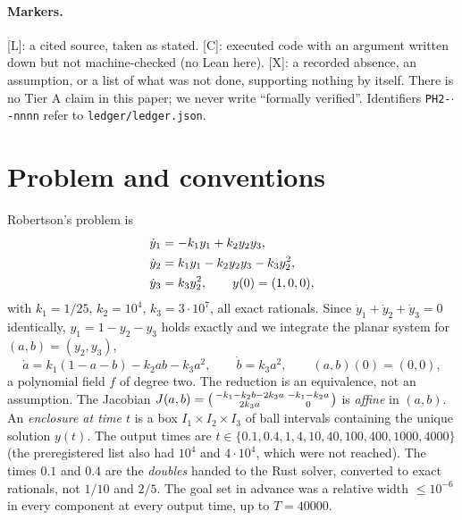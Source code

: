 \documentclass[11pt]{article}
\newcommand{\tier}[1]{\textsf{[#1]}}
\newcommand{\tL}{\tier{L}}
\newcommand{\tC}{\tier{C}}
\newcommand{\tX}{\tier{X}}
\theoremstyle{remark}
\begin{document}
\paragraph{Markers.} \tL{}: a cited source, taken as stated. \tC{}: executed code with an argument written down but not machine-checked (no Lean here). \tX{}: a recorded absence, an assumption, or a list of what was not done, supporting nothing by itself. There is no Tier A claim in this paper; we never write ``formally verified''. Identifiers \texttt{PH2-$\cdot$-nnnn} refer to \texttt{ledger/ledger.json}.

\section{Problem and conventions}\label{sec:prob}
Robertson's problem is
\begin{align}
\dot y_1&=-k_1y_1+k_2y_2y_3,\notag\\
\dot y_2&=k_1y_1-k_2y_2y_3-k_3y_2^2,\label{eq:rob}\\
\dot y_3&=k_3y_2^2,\qquad y(0)=(1,0,0),\notag
\end{align}
with $k_1=1/25$, $k_2=10^4$, $k_3=3\cdot10^7$, all exact rationals. Since $\dot y_1+\dot y_2+\dot y_3=0$ identically, $y_1=1-y_2-y_3$ holds exactly and we integrate the planar system for $(a,b)=(y_2,y_3)$,
\begin{equation}\label{eq:red}
\dot a=k_1(1-a-b)-k_2ab-k_3a^2,\qquad \dot b=k_3a^2,\qquad (a,b)(0)=(0,0),
\end{equation}
a polynomial field $f$ of degree two. The reduction is an equivalence, not an assumption. The Jacobian $J(a,b)=\begin{psmallmatrix}-k_1-k_2b-2k_3a & -k_1-k_2a\\ 2k_3a&0\end{psmallmatrix}$ is \emph{affine} in $(a,b)$.
An \emph{enclosure at time $t$} is a box $I_1\times I_2\times I_3$ of ball intervals containing the unique solution $y(t)$. The output times are $t\in\{0.1,0.4,1,4,10,40,100,400,1000,4000\}$ (the preregistered list also had $10^4$ and $4\cdot10^4$, which were not reached). The times $0.1$ and $0.4$ are the \emph{doubles} handed to the Rust solver, converted to exact rationals, not $1/10$ and $2/5$.
The goal set in advance was a relative width $\le10^{-6}$ in every component at every output time, up to $T=40000$.

\end{document}
